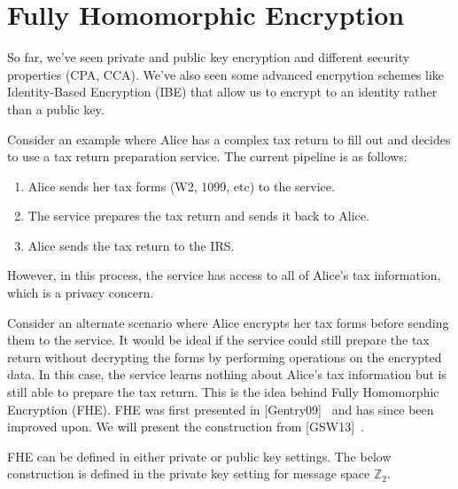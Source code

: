 \section{Fully Homomorphic Encryption}
So far, we've seen private and public key encryption and different security properties (CPA, CCA). We've also seen some advanced encrpytion schemes like Identity-Based Encryption (IBE) that allow us to encrypt to an identity rather than a public key. 

Consider an example where Alice has a complex tax return to fill out and decides to use a tax return preparation service. The current pipeline is as follows:
\begin{enumerate}
    \item Alice sends her tax forms (W2, 1099, etc) to the service.
    \item The service prepares the tax return and sends it back to Alice.
    \item Alice sends the tax return to the IRS.
\end{enumerate}
However, in this process, the service has access to all of Alice's tax information, which is a privacy concern. 

Consider an alternate scenario where Alice encrypts her tax forms before sending them to the service. It would be ideal if the service could still prepare the tax return without decrypting the forms by performing operations on the encrypted data. In this case, the service learns nothing about Alice's tax information but is still able to prepare the tax return. This is the idea behind Fully Homomorphic Encryption (FHE). FHE was first presented in [Gentry09]~\cite{STOC:Gentry09} and has since been improved upon. We will present the construction from [GSW13]~\cite{C:GenSahWat13}.

FHE can be defined in either private or public key settings. The below construction is defined in the private key setting for message space $\mathbb{Z}_2$.


